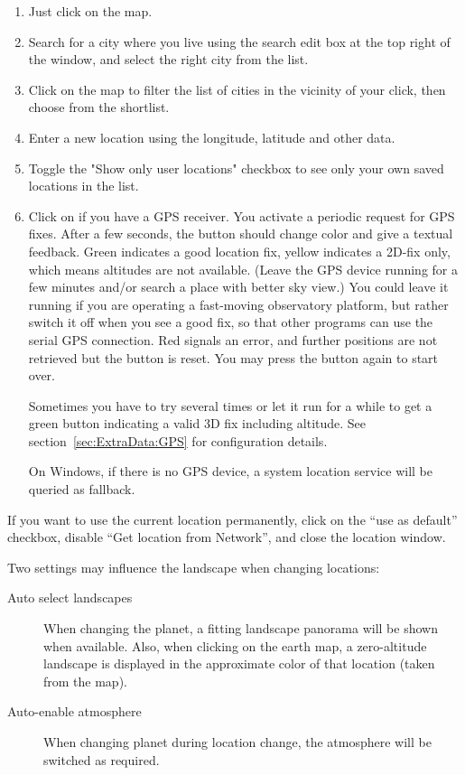\begin{enumerate}
\item Just click on the map.
\item Search for a city where you live using the search edit box at
  the top right of the window, and select the right city from the
  list.
\item Click on the map to filter the list of cities in the vicinity of
  your click, then choose from the shortlist.
\item Enter a new location using the longitude, latitude and other
  data.
\item Toggle the "Show only user locations" checkbox to see only your own 
  saved locations in the list.
\item Click on  if you have a GPS
  receiver. You activate a periodic request
  for GPS fixes. After a few seconds, the button should change color
  and give a textual feedback. Green indicates a good location fix, yellow
  indicates a 2D-fix only, which means altitudes are not
  available. (Leave the GPS device running for a few minutes and/or
  search a place with better sky view.) You could leave it running if
  you are operating a fast-moving observatory platform, but rather
  switch it off when you see a good fix, so that other programs can
  use the serial GPS connection.  Red signals an error, and further
  positions are not retrieved but the button is reset. You may press
  the button again to start over.

  Sometimes you have to try several times or let it run for a while to get a
  green button indicating a valid 3D fix including altitude.
  See section~\ref{sec:ExtraData:GPS} for configuration details.
  
  On Windows, if there is no GPS device, a system location service will be queried as fallback.
\end{enumerate}

\noindent If you want to use the current location permanently, click on the
``use as default'' checkbox, disable ``Get location from Network'',
and close the location window.

Two settings may influence the landscape when changing locations:
\begin{description}
\item[Auto select landscapes] When changing the planet, 
a fitting landscape panorama will be shown when available. 
Also,  when clicking on the earth map, 
a zero-altitude landscape is displayed in the approximate color of that location (taken from the map).
\item[Auto-enable atmosphere] When changing planet during
  location change, the atmosphere will be switched as required.
\end{description}

